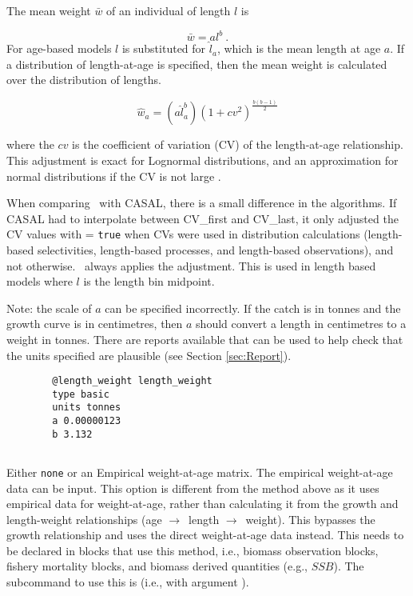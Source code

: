 The mean weight $\bar{w}$ of an individual of length $l$ is

\begin{equation}
  \bar{w} =a l^b \ .
\end{equation}
\ifAgeBased
For age-based models \(l\) is substituted for $\hat{l}_a$, which is the mean length at age $a$. If a distribution of length-at-age is specified, then the mean weight is calculated over the distribution of lengths.

\begin{equation}\label{eq:mean_weight_with_adjustment}
	\hat{w}_a=(a\hat{l}_a^b)(1+cv^2)^{\frac{b(b-1)}{2}}
\end{equation}

where the $cv$ is the coefficient of variation (CV) of the length-at-age relationship. This adjustment is exact for Lognormal distributions, and an approximation for normal distributions if the CV is not large \citep{1388}. 

When comparing \CNAME\ with CASAL, there is a small difference in the algorithms. If CASAL had to interpolate between CV\_first and CV\_last, it only adjusted the CV values with  = \texttt{true} when CVs were used in distribution calculations (length-based selectivities, length-based processes, and length-based observations), and not otherwise. \CNAME\ always applies the adjustment.
\else
This is used in length based models where \(l\) is the length bin midpoint. 
\fi

Note: the scale of $a$ can be specified incorrectly. If the catch is in tonnes and the growth curve is in centimetres, then $a$ should convert a length in centimetres to a weight in tonnes. There are reports available that can be used to help check that the units specified are plausible (see Section \ref{sec:Report}).
{\small{\begin{verbatim}
		@length_weight length_weight
		type basic
		units tonnes
		a 0.00000123
		b 3.132
\end{verbatim}}}

\ifAgeBased
\subsection{}\label{sec:AgeWeight} 

Either \texttt{none}\label{sec:AgeWeight-None} or an Empirical weight-at-age matrix. The empirical weight-at-age data can be input\label{sec:AgeWeight-Data}. This option is different from the method above as it uses empirical data for weight-at-age, rather than calculating it from the growth and length-weight relationships (age $\rightarrow$\ length $\rightarrow$\ weight). This bypasses the growth relationship and uses the direct weight-at-age data instead. This needs to be declared in blocks that use this method, i.e., biomass observation blocks, fishery mortality blocks, and biomass derived quantities (e.g., $SSB$). The subcommand to use this is  (i.e., with argument  ). 

